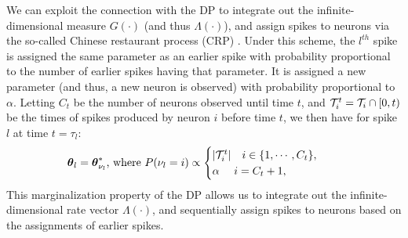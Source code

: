 We can exploit the connection with the DP to %
integrate out the infinite-dimensional measure $G(\cdot)$ (and thus $\Lambda(\cdot)$), and assign spikes to neurons via 
the so-called Chinese restaurant process (CRP) \citep{Pit2002a}. Under this scheme, the $l^{th}$ spike is assigned the same parameter as an earlier spike with probability 
proportional to the number of earlier spikes having that parameter. It is assigned a new parameter (and thus, a new neuron is observed) with probability 
proportional to $\alpha$. Letting $C_t$ be the number of neurons observed until time $t$, and  $\mathcal{T}^t_i = \mathcal{T}_i \cap [0,t)$ be the times of spikes 
produced by neuron $i$ before time $t$,
we then have for spike $l$ at time $t = \tau_l$: 
\vspace{-.06in}
\begin{align}
 \boldsymbol{\theta}_l = \boldsymbol{\theta}^*_{\nu_l} \text{, where } 
  P({\nu_l} = i) & \propto 
  \begin{cases}
   |\mathcal{T}^t_i| \quad i \in \{1,\cdots, C_{t}\}, \\
   \alpha \quad\ i = C_{t} + 1, 
  \end{cases}  
\label{eq:crp_marg_pr}
\end{align}
This marginalization property of the DP allows us to integrate out the infinite-dimensional rate vector $\mathsf{\Lambda}(\cdot)$, and sequentially 
assign spikes to neurons based on the assignments of earlier spikes.
